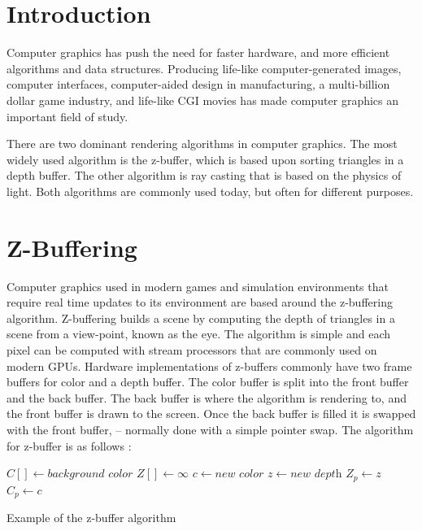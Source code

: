 \documentclass[11pt,a4paper,oneside]{article}
\begin{document}
\section{ Introduction }
Computer graphics has push the need for faster hardware,  and more efficient algorithms and data structures.  Producing life-like computer-generated images,  computer interfaces, computer-aided design in manufacturing, a multi-billion dollar game industry, and life-like CGI movies\cite{gaming:2007} has made computer graphics an important field of study.

There are two dominant rendering algorithms in computer graphics.  The most widely used algorithm is the z-buffer, which is based upon sorting triangles in a depth buffer.  The other algorithm is ray casting that is based on the physics of light.  Both algorithms are commonly used today, but often for different purposes.  

\section{Z-Buffering}

Computer graphics used in modern games and simulation environments that require real time updates to its environment are based around the z-buffering algorithm.  Z-buffering builds a scene by computing the depth of triangles in a scene from a view-point,  known as the eye.  The algorithm is simple and each pixel can be computed with stream processors that are commonly  used on modern GPUs.  Hardware implementations of z-buffers commonly have two frame buffers for color and a depth buffer.    The color buffer is split into the front buffer and the back buffer.  The back buffer is where the algorithm is rendering to, and the front buffer is drawn to the screen.  Once the back buffer is filled it is swapped with the front buffer,  -- normally done with a simple pointer swap.  The algorithm for z-buffer is as follows \cite{fast:2008}:

\begin{algorithm}
\begin{algorithmic}[1]
\STATE $C[ ] \gets \textit{background color}$ 
\STATE $Z[ ] \gets \infty$
		\STATE $c \gets \textit{new color}$
		\STATE $z \gets \textit{new depth}$
			\STATE $Z_{p} \gets z$
			\STATE $C_{p} \gets c$
		\ENDIF
	\ENDFOR
\ENDFOR
\end{algorithmic}
\caption{Example of the z-buffer algorithm}
\label{z-buffer}
\end{algorithm}
\end{document}

